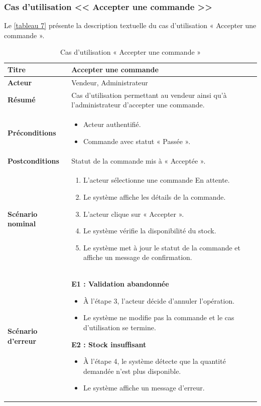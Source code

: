\subsubsection{Cas d'utilisation << Accepter une commande >>}

Le \autoref{tableau 7} présente la description textuelle du cas d'utilisation « Accepter une commande ».

\begin{table}[H]
\centering
\renewcommand{\arraystretch}{1.4}
\begin{tabular}{|p{4cm}|p{10cm}|}
\hline
\textbf{Titre} & Accepter une commande \\
\hline
\textbf{Acteur} & Vendeur, Administrateur \\
\hline
\textbf{Résumé} & Cas d'utilisation permettant au vendeur ainsi qu'à l'administrateur d'accepter une commande. \\
\hline
\textbf{Préconditions} &
\vspace{-12pt}
\begin{itemize}
    \item Acteur authentifié.
    \item Commande avec statut « Passée ».
\end{itemize} \\
\hline
\textbf{Postconditions} & Statut de la commande mis à « Acceptée ». \\
\hline
\textbf{Scénario nominal} &
\vspace{-12pt}
\begin{enumerate}
    \item L'acteur sélectionne une commande En attente.
    \item Le système affiche les détails de la commande.
    \item L'acteur clique sur « Accepter ».
    \item Le système vérifie la disponibilité du stock.
    \item Le système met à jour le statut de la commande et affiche un message de confirmation.
\end{enumerate} \\
\hline
\textbf{Scénario d'erreur} &
\vspace{-12pt}
\textbf{E1 : Validation abandonnée}
\begin{itemize}
    \item À l'étape 3, l'acteur décide d'annuler l'opération.
    \item Le système ne modifie pas la commande et le cas d'utilisation se termine.
\end{itemize}

\textbf{E2 : Stock insuffisant}
\begin{itemize}
    \item À l'étape 4, le système détecte que la quantité demandée n'est plus disponible.
    \item Le système affiche un message d'erreur.
\end{itemize} \\
\hline
\end{tabular}
\caption{Cas d'utilisation « Accepter une commande »}
\label{tableau 7}
\end{table}

